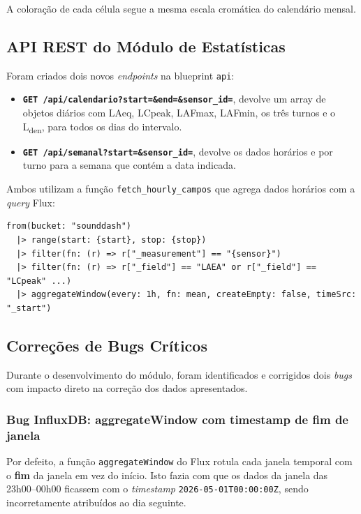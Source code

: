 \documentclass[12pt,a4paper]{report}
\begin{document}
A coloração de cada célula segue a mesma escala cromática do calendário mensal.

\subsection{API REST do Módulo de Estatísticas}

Foram criados dois novos \textit{endpoints} na blueprint \texttt{api}:

\begin{itemize}
  \item \textbf{\texttt{GET /api/calendario?start=\&end=\&sensor\_id=}},  devolve um array de objetos diários com LAeq, LCpeak, LAFmax, LAFmin, os três turnos e o L\textsubscript{den}, para todos os dias do intervalo.
  \item \textbf{\texttt{GET /api/semanal?start=\&sensor\_id=}},  devolve os dados horários e por turno para a semana que contém a data indicada.
\end{itemize}

Ambos utilizam a função \texttt{fetch\_hourly\_campos} que agrega dados horários com a \textit{query} Flux:

\begin{lstlisting}[style=flux, caption={Query Flux para agregação horária (acoustics.py)}]
from(bucket: "sounddash")
  |> range(start: {start}, stop: {stop})
  |> filter(fn: (r) => r["_measurement"] == "{sensor}")
  |> filter(fn: (r) => r["_field"] == "LAEA" or r["_field"] == "LCpeak" ...)
  |> aggregateWindow(every: 1h, fn: mean, createEmpty: false, timeSrc: "_start")
\end{lstlisting}

\subsection{Correções de Bugs Críticos}

Durante o desenvolvimento do módulo, foram identificados e corrigidos dois \textit{bugs} com impacto direto na correção dos dados apresentados.

\subsubsection{Bug InfluxDB: aggregateWindow com timestamp de fim de janela}

Por defeito, a função \texttt{aggregateWindow} do Flux rotula cada janela temporal com o \textbf{fim} da janela em vez do início. Isto fazia com que os dados da janela das 23h00--00h00 ficassem com o \textit{timestamp} \texttt{2026-05-01T00:00:00Z}, sendo incorretamente atribuídos ao dia seguinte.
\end{document}
